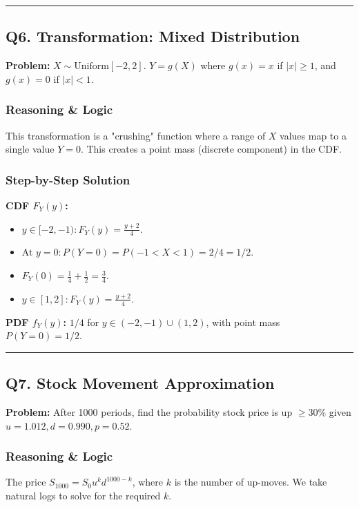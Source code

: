 \documentclass[11pt]{article}
\begin{document}
\vspace{0.5cm}
\hrule
\vspace{0.5cm}

\subsection*{Q6. Transformation: Mixed Distribution}

\textbf{Problem:} $X \sim \text{Uniform}[-2, 2]$. $Y = g(X)$ where $g(x)=x$ if $|x| \ge 1$, and $g(x)=0$ if $|x| < 1$.

\subsubsection*{Reasoning \& Logic}
This transformation is a "crushing" function where a range of $X$ values map to a single value $Y=0$. This creates a point mass (discrete component) in the CDF.

\subsubsection*{Step-by-Step Solution}
\textbf{CDF $F_Y(y)$:}
\begin{itemize}
    \item $y \in [-2, -1): F_Y(y) = \frac{y+2}{4}$.
    \item At $y=0: P(Y=0) = P(-1 < X < 1) = 2/4 = 1/2$.
    \item $F_Y(0) = \frac{1}{4} + \frac{1}{2} = \frac{3}{4}$.
    \item $y \in [1, 2]: F_Y(y) = \frac{y+2}{4}$.
\end{itemize}
\textbf{PDF $f_Y(y)$:} $1/4$ for $y \in (-2, -1) \cup (1, 2)$, with point mass $P(Y=0) = 1/2$.

\vspace{0.5cm}
\hrule
\vspace{0.5cm}

\subsection*{Q7. Stock Movement Approximation}

\textbf{Problem:} After 1000 periods, find the probability stock price is up $\ge 30\%$ given $u=1.012, d=0.990, p=0.52$.

\subsubsection*{Reasoning \& Logic}
The price $S_{1000} = S_0 u^k d^{1000-k}$, where $k$ is the number of up-moves. We take natural logs to solve for the required $k$.
\end{document}
